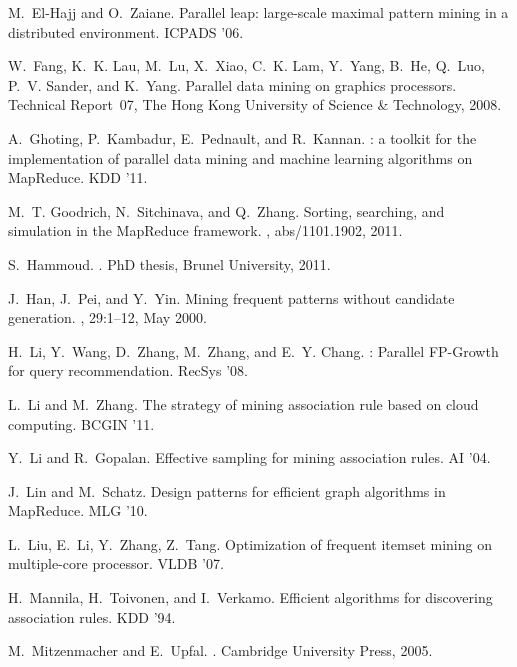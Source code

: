 \begin{thebibliography}{10}
\begin{small}
M.~El-Hajj and O.~Zaiane.
\newblock Parallel leap: large-scale maximal pattern mining in a distributed
  environment.
\newblock ICPADS '06.

W.~Fang, K.~K. Lau, M.~Lu, X.~Xiao, C.~K. Lam, Y.~Yang, B.~He, Q.~Luo, P.~V.
  Sander, and K.~Yang.
\newblock Parallel data mining on graphics processors.
\newblock Technical Report~07, The Hong Kong University of Science {\&}
  Technology, 2008.

A.~Ghoting, P.~Kambadur, E.~Pednault, and R.~Kannan.
: a toolkit for the implementation of parallel data mining
and machine learning algorithms on {MapReduce}.
\newblock KDD '11.

M.~T. Goodrich, N.~Sitchinava, and Q.~Zhang.
\newblock Sorting, searching, and simulation in the {MapReduce} framework.
, abs/1101.1902, 2011.

S.~Hammoud.
.
\newblock PhD thesis, Brunel University, 2011.

J.~Han, J.~Pei, and Y.~Yin.
\newblock Mining frequent patterns without candidate generation.
, 29:1--12, May 2000.

H.~Li, Y.~Wang, D.~Zhang, M.~Zhang, and E.~Y. Chang.
: Parallel {FP-G}rowth for query recommendation.
\newblock RecSys '08.

L.~Li and M.~Zhang.
\newblock The strategy of mining association rule based on cloud computing.
\newblock BCGIN '11.

Y.~Li and R.~Gopalan.
\newblock Effective sampling for mining association rules.
\newblock AI '04.

J.~Lin and M.~Schatz.
\newblock Design patterns for efficient graph algorithms in MapReduce.
\newblock  MLG '10.

L.~Liu, E.~Li, Y.~Zhang, Z.~Tang.
\newblock Optimization of frequent itemset mining on multiple-core processor.
\newblock VLDB '07.

H.~Mannila, H.~Toivonen, and I.~Verkamo.
\newblock Efficient algorithms for discovering association rules.
\newblock KDD '94.

M.~Mitzenmacher and E.~Upfal.
.
\newblock Cambridge University Press, 2005.


\end{small}
\end{thebibliography}
